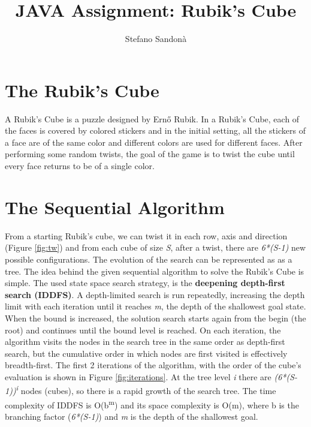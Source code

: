 \documentclass[a4paper]{article}
\begin{document}
\title{JAVA Assignment: Rubik's Cube}
\author{Stefano Sandonà}
\date{}
		
\maketitle

\section{The Rubik's Cube}
\label{sec:rubiks_cube}

A Rubik's Cube is a puzzle designed by Ernő Rubik. In a Rubik's Cube, each of the faces is covered by colored stickers and in the initial setting, all the stickers of a face are of the same color and different colors are used for different faces. After performing some random twists, the goal of the game is to twist the cube until every face returns to be of a single color. 

\section{The Sequential Algorithm}
\label{sec:seq_algo}
From a starting Rubik's cube, we can twist it in each row, axis and direction (Figure \ref{fig:tw}) and from each cube of size \textit{S}, after a twist, there are \textit{6*(S-1)} new possible configurations. The evolution of the search can be represented as as a tree. The idea behind the given sequential algorithm to solve the Rubik's Cube is simple. The used state space search strategy, is the \textbf{deepening depth-first search (IDDFS)}. A depth-limited search is run repeatedly, increasing the depth limit with each iteration until it reaches \textit{m}, the depth of the shallowest goal state. When the bound is increased, the solution search starts again from the begin (the root) and continues until the bound level is reached. On each iteration, the algorithm visits the nodes in the search tree in the same order as depth-first search, but the cumulative order in which nodes are first visited is effectively breadth-first. The first 2 iterations of the algorithm, with the order of the cube's evaluation is shown in Figure \ref{fig:iterations}. At the tree level \textit{i} there are \textit{(6*(S-1))\textsuperscript{i}} nodes (cubes), so there is a rapid growth of the search tree. The time complexity of IDDFS is O(b\textsuperscript{m}) and its space complexity is O(m), where b is the branching factor (\textit{6*(S-1)}) and \textit{m} is the depth of the shallowest goal.
\end{document}
